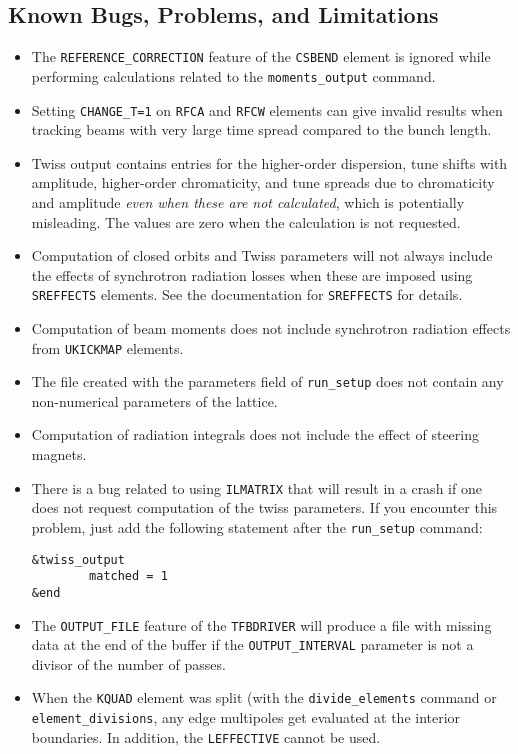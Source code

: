 \documentclass[11pt]{article}
\begin{document}
\subsection{Known Bugs, Problems, and Limitations}
\begin{itemize}
\item The \verb|REFERENCE_CORRECTION| feature of the \verb|CSBEND| element is ignored while performing calculations related
  to the \verb|moments_output| command.
\item Setting \verb|CHANGE_T=1| on \verb|RFCA| and \verb|RFCW| elements can give invalid results when tracking beams with very 
  large time spread compared to the bunch length.
\item Twiss output contains entries for the higher-order dispersion, tune shifts with amplitude, higher-order chromaticity, and tune spreads
  due to chromaticity and amplitude {\em even when these are not calculated}, which is potentially
  misleading.   The values are zero when the calculation is not requested.
\item Computation of closed orbits and Twiss parameters will not always include the effects of synchrotron
  radiation losses when these are imposed using {\tt SREFFECTS} elements.  See
  the documentation for {\tt SREFFECTS} for details.
\item Computation of beam moments does not include synchrotron radiation effects from \verb|UKICKMAP| elements.
\item The file created with the parameters field of \verb|run_setup| does not contain
  any non-numerical parameters of the lattice.
\item Computation of radiation integrals does not include the effect of steering magnets.
\item There is a bug related to using {\tt ILMATRIX} that will result in a crash
  if one does not request computation of the twiss parameters. If you encounter this
  problem, just add the following statement after the \verb|run_setup| command:
\begin{verbatim}
&twiss_output
        matched = 1
&end
\end{verbatim}
\item The \verb|OUTPUT_FILE| feature of the \verb|TFBDRIVER| will produce a file with missing data at the end of
  the buffer if the \verb|OUTPUT_INTERVAL| parameter is not a divisor of the number of passes.
\item When the \verb|KQUAD| element was split (with the \verb|divide_elements| command or
  \verb|element_divisions|, any edge multipoles get evaluated at the interior boundaries. In addition, the
  \verb|LEFFECTIVE| cannot be used.
\end{itemize}
\end{document}
